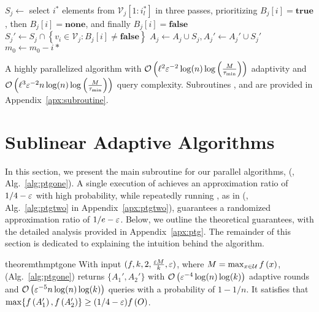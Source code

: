 \begin{algorithm*}[ht]
{{{{                $S_j\gets$ select $i^*$ elements from $\mathcal V_j[1:i^*_l]$ in three passes, prioritizing $B_j[i] = \textbf{true}$, then $B_j[i] = \textbf{none}$, and finally $B_j[i] = \textbf{false}$
                \label{line:tgone-subset}\;
                $S_j'\gets S_j\cap \left\{v_i \in \mathcal V_j: B_j[i]\neq \textbf{false}\right\}$\label{line:tgone-subset-2}\;
                $A_j\gets A_j\cup S_j, A_j'\gets A_j'\cup S_j'$\label{line:tgone-update-A-2}\;
            }
            $m_0\gets m_0-i*$ \label{line:tgone-update-size}\;\label{line:pig-else-end}
        }
    }
}
\caption{A highly parallelized algorithm with $\mathcal O \left( \ell^2\varepsilon^{-2} \log(n)\log\left(\frac{M}{\tau_{\min}}\right) \right)$ adaptivity
and $\mathcal O \left( \ell^3\varepsilon^{-2} n \log(n)\log\left(\frac{M}{\tau_{\min}}\right) \right)$ query complexity. Subroutines \update, \dist and \prefix are provided in Appendix~\ref{apx:subroutine}.}
\label{alg:ptgone}
\end{algorithm*}

\section{Sublinear Adaptive Algorithms}\label{sec:ptg}
In this section, we present the main subroutine for our parallel algorithms, 
\ptgone (\ptgoneshort, Alg.~\ref{alg:ptgone}).
A single execution of \ptgoneshort achieves an 
approximation ratio of $1/4-\varepsilon$ with high probability,
while repeatedly running \ptgoneshort, as in \ptgtwo (\ptgtwoshort, Alg.~\ref{alg:ptgtwo} in 
Appendix~\ref{apx:ptgtwo}), 
guarantees a randomized approximation ratio of $1/e-\varepsilon$.
Below, we outline the theoretical guarantees,
with the detailed analysis provided in Appendix~\ref{apx:ptg}.
The remainder of this section is dedicated to 
explaining the intuition behind the algorithm.
\begin{restatable}{theorem}{thmptgone}\label{thm:ptgone}
With input $(f, k, 2, \frac{\varepsilon M}{k}, \varepsilon)$,
where $M = \max_{x\in \mathcal U} f \left( x \right)$,
\ptgoneshort (Alg.~\ref{alg:ptgone}) returns $\{A_1', A_2'\}$
with $\mathcal O \left( \varepsilon^{-4}\log(n)\log(k) \right)$ adaptive rounds and $\mathcal O \left( \varepsilon^{-5}n\log(n)\log(k) \right)$ queries with a probability of $1-1/n$.
It satisfies that $\max\{f \left( A_1' \right), f \left( A_2' \right)\}\ge (1/4-\varepsilon)f \left( O \right)$.
\end{restatable}

